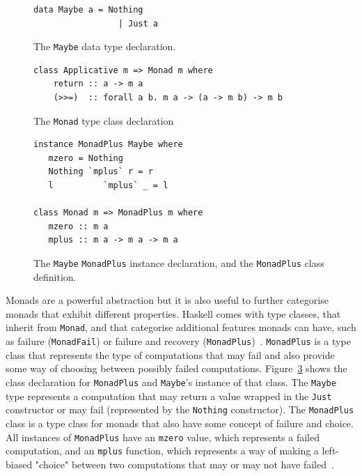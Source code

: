 \begin{figure}[t]
\begin{lstlisting}
data Maybe a = Nothing
                 | Just a
\end{lstlisting}
\caption{The \texttt{Maybe} data type declaration.}
\label{maybeDecl}
\end{figure}

\begin{figure}[t]
\begin{lstlisting}
class Applicative m => Monad m where
	return :: a -> m a
    (>>=)  :: forall a b. m a -> (a -> m b) -> m b
\end{lstlisting}
\caption{The \texttt{Monad} type class declaration}
\label{monadTC}
\end{figure}

\begin{figure}[t]
\begin{lstlisting}                 
instance MonadPlus Maybe where
   mzero = Nothing
   Nothing `mplus` r = r
   l          `mplus` _ = l
                 
class Monad m => MonadPlus m where
   mzero :: m a
   mplus :: m a -> m a -> m a
\end{lstlisting}
\caption{The \texttt{Maybe} \texttt{MonadPlus} instance declaration, and the \texttt{MonadPlus} class definition.}
\label{maybeMonadPlus}
\end{figure}

Monads are a powerful abstraction but it is also useful to further categorise monads that exhibit different properties. Haskell comes with type classes, that inherit from \texttt{Monad}, and that categorise additional features monads can have, such as failure (\texttt{MonadFail}) or failure and recovery (\texttt{MonadPlus})~\citep{typeclassopedia}. \texttt{MonadPlus} is a type class that represents the type of computations that may fail and also provide some way of choosing between possibly failed computations. Figure~\ref{maybeMonadPlus} shows the class declaration for \texttt{MonadPlus} and \texttt{Maybe}'s instance of that class. The \texttt{Maybe} type represents a computation that may return a value wrapped in the \texttt{Just} constructor or may fail (represented by the \texttt{Nothing} constructor). The \texttt{MonadPlus} class is a type class for monads that also have some concept of failure and choice. All instances of \texttt{MonadPlus} have an \texttt{mzero} value, which represents a failed computation, and an \texttt{mplus} function, which represents a way of making a left-biased "choice" between two computations that may or may not have failed~\citep{typeclassopedia}. 


